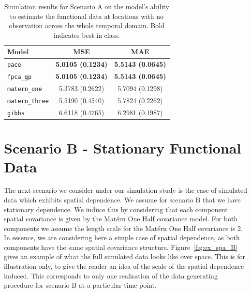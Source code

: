 \begin{table}
	\caption[Simulation results for Scenario A on test data]{Simulation results for Scenario A on the model's ability to estimate the functional data at locations with no observation across the whole temporal domain. Bold indicates best in class.}
	\centering
	\label{tab:test_A}
	\begin{tabular}{lcc}
		\toprule
		\textbf{Model} & \textbf{MSE} & \textbf{MAE} \\
		\midrule
		\verb*|pace| & \textbf{5.0105 (0.1234)} & \textbf{5.5143 (0.0645)} \\
		\verb*|fpca_gp| & \textbf{5.0105 (0.1234)} & \textbf{5.5143 (0.0645)} \\
		\verb*|matern_one| & 5.3783	(0.2622) & 5.7094 (0.1298) \\
		\verb*|matern_three| & 5.5190 (0.4540) & 5.7824	(0.2262) \\
		\verb*|gibbs| & 6.6118 (0.4765) & 6.2981 (0.1987)\\
		\bottomrule
	\end{tabular}
\end{table}

\section{Scenario B - Stationary Functional Data \label{sec:sim_B}}
The next scenario we consider under our simulation study is the case of simulated data which exhibits spatial dependence.
We assume for scenario B that we have stationary dependence.
We induce this by considering that each component spatial covariance is given by the Mat\'ern One Half covariance model.
For both components we assume the length scale for the Mat\'ern One Half covariance is 2.
In essence, we are considering here a simple case of spatial dependence, as both components have the same spatial covariance structure.
Figure~\ref{fig:ex_spa_B} gives an example of what the full simulated data looks like over space.
This is for illustration only, to give the reader an idea of the scale of the spatial dependence induced.
This corresponds to only one realisation of the data generating procedure for scenario B at a particular time point.

